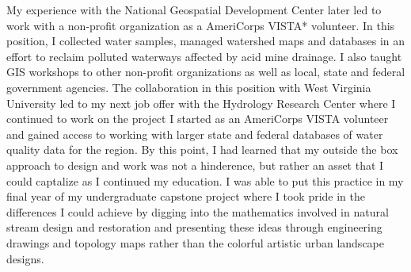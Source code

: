 \documentclass[12pt, letterpaper]{awesome-cv} %
\begin{document}
\begin{cvletter}
My experience with the National Geospatial Development Center later led to work with a non-profit organization as a AmeriCorps VISTA* volunteer. In this position, I collected water samples, managed watershed maps and databases in an effort to reclaim polluted waterways affected by acid mine drainage. I also taught GIS workshops to other non-profit organizations as well as local, state and federal government agencies. The collaboration in this position with West Virginia University led to my next job offer with the Hydrology Research Center where I continued to work on the project I started as an AmeriCorps VISTA volunteer and gained access to working with larger state and federal databases of water quality data for the region. By this point, I had learned that my outside the box approach to design and work was not a hinderence, but rather an asset that I could captalize as I continued my education. I was able to put this practice in my final year of my undergraduate capstone project where I took pride in the differences I could achieve by digging into the mathematics involved in natural stream design and restoration and presenting these ideas through engineering drawings and topology maps rather than the colorful artistic urban landscape designs.


\end{cvletter}
\end{document}
